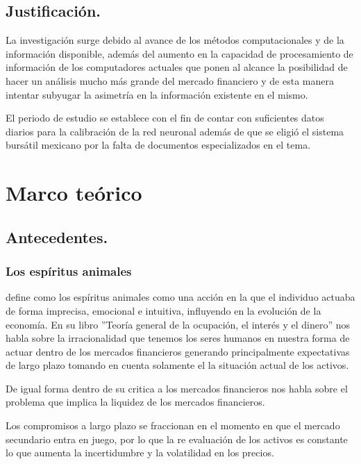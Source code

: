 \documentclass[letterpaper,12pt,oneside]{book}
\begin{document}
  

    
    \section*{Justificación.}

La investigación surge debido al avance de los métodos computacionales y de la información disponible, además del aumento en la capacidad de procesamiento de información de los computadores actuales que ponen al alcance la posibilidad de hacer un análisis mucho más grande del mercado financiero y de esta manera intentar subyugar la asimetría en la información existente en el mismo.

El periodo de estudio se establece con el fin de contar con suficientes datos diarios para la calibración de la red neuronal además de que se eligió el sistema bursátil mexicano por la falta de documentos especializados en el tema.
    


\mainmatter
\chapter{Marco teórico}

\section{Antecedentes.}

\subsection{Los espíritus animales}

\cite{a11} define como los espíritus animales como una acción en la que el individuo actuaba de forma imprecisa, emocional e intuitiva, influyendo en la evolución de la economía. 
En su libro ''Teoría general de la ocupación, el interés y el dinero'' \cite{a12} nos habla sobre la irracionalidad que tenemos los seres humanos en nuestra forma de actuar dentro de los mercados financieros generando principalmente expectativas de largo plazo tomando en cuenta solamente el la situación actual de los activos.

De igual forma dentro de su critica a los mercados financieros nos habla sobre el problema que implica la liquidez de los mercados financieros.

Los compromisos a largo plazo se fraccionan en el momento en que el mercado secundario entra en juego, por lo que la re evaluación de los activos es constante lo que aumenta la incertidumbre y la volatilidad en los precios.
\end{document}
